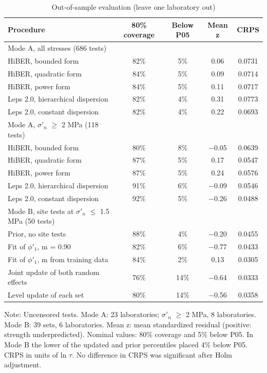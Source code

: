 \documentclass[Journal,letterpaper]{ascelike-new}
\begin{document}
\begin{table}
\caption{Out-of-sample evaluation (leave one laboratory out)}
\label{tab:2}
\centering\footnotesize
\renewcommand{\arraystretch}{1.15}
\setlength{\tabcolsep}{3pt}
\begin{tabular}{lcccc}
\hline
Procedure & 80\% coverage & Below P05 & Mean z & CRPS \\
\hline
Mode A, all stresses (686 tests) &  &  &  &  \\
   HiBER, bounded form & 82\% & 5\% & 0.06 & 0.0731 \\
   HiBER, quadratic form & 84\% & 5\% & 0.09 & 0.0714 \\
   HiBER, power form & 84\% & 5\% & 0.11 & 0.0717 \\
   Leps 2.0, hierarchical dispersion & 82\% & 4\% & 0.31 & 0.0773 \\
   Leps 2.0, constant dispersion & 82\% & 4\% & 0.22 & 0.0693 \\
Mode A, $\sigma'_n$ $\ge$ 2 MPa (118 tests) &  &  &  &  \\
   HiBER, bounded form & 80\% & 8\% & $-$0.05 & 0.0639 \\
   HiBER, quadratic form & 87\% & 5\% & 0.17 & 0.0547 \\
   HiBER, power form & 87\% & 5\% & 0.24 & 0.0576 \\
   Leps 2.0, hierarchical dispersion & 91\% & 6\% & $-$0.09 & 0.0546 \\
   Leps 2.0, constant dispersion & 92\% & 5\% & $-$0.26 & 0.0488 \\
Mode B, site tests at $\sigma'_n$ $\le$ 1.5 MPa (50 tests) &  &  &  &  \\
   Prior, no site tests & 88\% & 4\% & $-$0.20 & 0.0455 \\
   Fit of $\phi'_1$, m = 0.90 & 82\% & 6\% & $-$0.77 & 0.0433 \\
   Fit of $\phi'_1$, m from training data & 84\% & 2\% & 0.13 & 0.0305 \\
   Joint update of both random effects & 76\% & 14\% & $-$0.64 & 0.0333 \\
   Level update of each set & 80\% & 14\% & $-$0.56 & 0.0358 \\
\hline
\end{tabular}
\par\vspace{4pt}\parbox{\linewidth}{\footnotesize Note: Uncensored tests. Mode A: 23 laboratories; $\sigma'_n$ $\ge$ 2 MPa, 8 laboratories. Mode B: 39 sets, 6 laboratories. Mean z: mean standardized residual (positive: strength underpredicted). Nominal values: 80\% coverage and 5\% below P05. In Mode B the lower of the updated and prior percentiles placed 4\% below P05. CRPS in units of ln $\tau$. No difference in CRPS was significant after Holm adjustment.}
\end{table}
\end{document}

